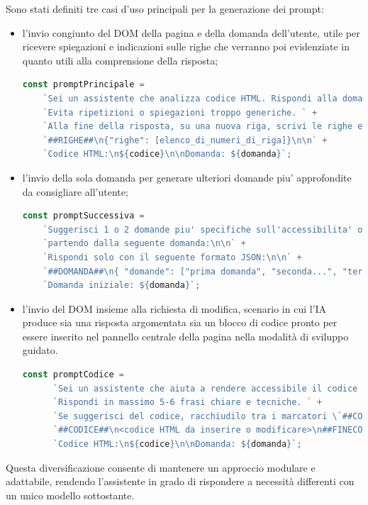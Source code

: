 \noindent Sono stati definiti tre casi d’uso principali per la generazione dei prompt: 
\begin{itemize}
    \item l’invio congiunto del DOM della pagina e della domanda dell’utente, utile per ricevere spiegazioni e indicazioni sulle righe che verranno poi evidenziate in quanto utili alla comprensione della risposta; 
    \begin{lstlisting}[language=JavaScript, caption={Prompt per la generazione di risposta e righe da evidenziare}]
    const promptPrincipale =
    `Sei un assistente che analizza codice HTML. Rispondi alla domanda in modo chiaro ma conciso, usando al massimo 5-6 frasi. ` +
    `Evita ripetizioni o spiegazioni troppo generiche. ` +
    `Alla fine della risposta, su una nuova riga, scrivi le righe eventualmente utilizzate per la risposta nel seguente formato:\n\n` +
    `##RIGHE##\n{"righe": [elenco_di_numeri_di_riga]}\n\n` +
    `Codice HTML:\n${codice}\n\nDomanda: ${domanda}`;
    \end{lstlisting}
    
    \item l'invio della sola domanda per generare ulteriori domande piu' approfondite da consigliare all'utente;
    \begin{lstlisting}[language=JavaScript, caption={Prompt per la generazione di domande successive}]
    const promptSuccessiva =
    `Suggerisci 1 o 2 domande piu' specifiche sull'accessibilita' o sull'analisi del codice, ` +
    `partendo dalla seguente domanda:\n\n` +
    `Rispondi solo con il seguente formato JSON:\n\n` +
    `##DOMANDA##\n{ "domande": ["prima domanda", "seconda...", "terza..."] }\n\n` +
    `Domanda iniziale: ${domanda}`;
    \end{lstlisting}

    
    \item l’invio del DOM insieme alla richiesta di modifica, scenario in cui l’IA produce sia una risposta argomentata sia un blocco di codice pronto per essere inserito nel pannello centrale della pagina nella modalità di sviluppo guidato.
    \begin{lstlisting}[language=JavaScript, caption={Prompt per la generazione di risposta e codice html accessibile}]
    const promptCodice =
      `Sei un assistente che aiuta a rendere accessibile il codice HTML. ` +
      `Rispondi in massimo 5-6 frasi chiare e tecniche. ` +
      `Se suggerisci del codice, racchiudilo tra i marcatori \`##CODICE##\` come mostrato di seguito:\n\n` +
      `##CODICE##\n<codice HTML da inserire o modificare>\n##FINECODICE##\n\n` +
      `Codice HTML:\n${codice}\n\nDomanda: ${domanda}`;
    \end{lstlisting}

\end{itemize}
Questa diversificazione consente di mantenere un approccio modulare e adattabile, rendendo l’assistente in grado di rispondere a necessità differenti con un unico modello sottostante.



